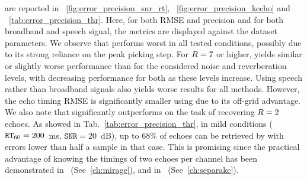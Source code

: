  are reported in ~\cref{fig:error_precision_snr_rt}, ~\cref{fig:error_precision_kecho} and ~\cref{tab:error_precision_thr}.
Here, for both RMSE and precision and for both broadband and speech signal, the metrics are displayed against the dataset parameters.
We observe that \algoBsn{} performs worst in all tested conditions, possibly due to its strong reliance on the peak picking step.
For $R=7$ or higher, \algoBraire{} yields similar or slightly worse performance than \algoCrocco{} for the considered noise and reverberation levels, with decreasing performance for both as these levels increase.
Using speech rather than broadband signals also yields worse results for all methods.
However, the echo timing RMSE is significantly smaller using \algoBraire{} due to its off-grid advantage.
We also note that \algoBraire{} significantly outperforms \algoCrocco{} on the task of recovering $R=2$ echoes.
As showed in Tab.~\ref{tab:error_precision_thr}, in mild conditions ($\mathtt{RT}_{60} = 200$~ms, $\mathtt{SNR} = 20$~dB), up to 68\% of echoes can be retrieved by \algoBraire{} with errors lower than half a sample in that case.
This is promising since the practical advantage of knowing the timings of two echoes per channel has been demonstrated in~ (See~\cref{ch:mirage}), and in~ (See~\cref{ch:separake}).

